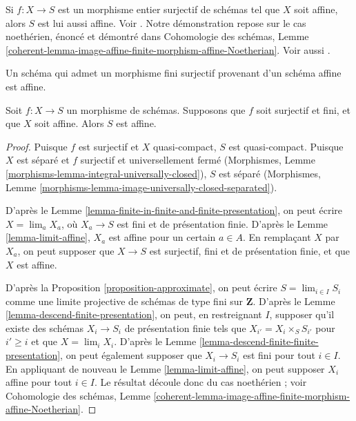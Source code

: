 \noindent
Si $f : X \to S$ est un morphisme entier surjectif de schémas
tel que $X$ soit affine, alors $S$ est lui aussi affine.
Voir \cite[A.2]{Conrad-Nagata}. Notre démonstration repose
sur le cas noethérien, énoncé et démontré dans Cohomologie des schémas,
Lemme \ref{coherent-lemma-image-affine-finite-morphism-affine-Noetherian}.
Voir aussi \cite[II 6.7.1]{EGA}.

\begin{lemma}
\label{lemma-affine}
\begin{slogan}
Un schéma qui admet un morphisme fini surjectif provenant d'un schéma affine est affine.
\end{slogan}
Soit $f : X \to S$ un morphisme de schémas.
Supposons que $f$ soit surjectif et fini, et que $X$ soit affine.
Alors $S$ est affine.
\end{lemma}

\begin{proof}
Puisque $f$ est surjectif et $X$ quasi-compact, $S$ est
quasi-compact. Puisque $X$ est séparé et $f$ surjectif et
universellement fermé (Morphismes, Lemme
\ref{morphisms-lemma-integral-universally-closed}), $S$
est séparé (Morphismes, Lemme
\ref{morphisms-lemma-image-universally-closed-separated}).

\medskip\noindent
D'après le Lemme \ref{lemma-finite-in-finite-and-finite-presentation},
on peut écrire $X = \lim_a X_a$, où $X_a \to S$ est fini et de présentation
finie. D'après le Lemme \ref{lemma-limit-affine}, $X_a$
est affine pour un certain $a \in A$. En remplaçant $X$ par $X_a$, on peut supposer
que $X \to S$ est surjectif, fini et de présentation finie, et
que $X$ est affine.

\medskip\noindent
D'après la Proposition \ref{proposition-approximate}, on peut écrire
$S = \lim_{i \in I} S_i$ comme
une limite projective de schémas de type fini sur $\mathbf{Z}$.
D'après le Lemme \ref{lemma-descend-finite-presentation}, on peut,
en restreignant $I$, supposer qu'il existe des schémas $X_i \to S_i$
de présentation finie tels que $X_{i'} = X_i \times_S S_{i'}$
pour $i' \geq i$ et que $X = \lim_i X_i$. D'après le
Lemme \ref{lemma-descend-finite-finite-presentation}, on peut
également supposer que $X_i \to S_i$ est fini pour tout $i \in I$.
En appliquant de nouveau le Lemme \ref{lemma-limit-affine}, on peut supposer $X_i$
affine pour tout $i \in I$. Le résultat découle donc du
cas noethérien ; voir Cohomologie des schémas,
Lemme \ref{coherent-lemma-image-affine-finite-morphism-affine-Noetherian}.
\end{proof}

